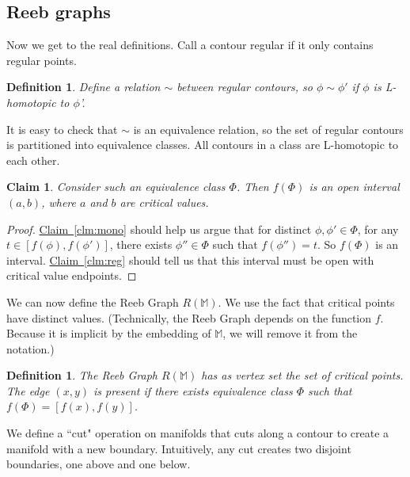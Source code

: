 \documentclass[11pt]{article}
\newtheorem{claim}[theorem]{Claim}
\newtheorem{definition}[theorem]{Definition}
\theoremstyle{definition}
\newcommand{\MM}{\mathbb{M}}
\newcommand{\Clm}[1]{\hyperref[clm:#1]{Claim~\ref*{clm:#1}}} %
\newcommand{\reeb}{R}
\begin{document}
\subsection{Reeb graphs} \label{sec:reeb}

Now we get to the real definitions. Call a contour regular if it only contains regular points.

\begin{definition} \label{def:rel} Define a relation $\sim$ between regular contours, so $\phi \sim \phi'$ if $\phi$
is L-homotopic to $\phi$'.
\end{definition}

It is easy to check that $\sim$ is an equivalence relation, so the set of regular contours
is partitioned into equivalence classes. All contours in a class are L-homotopic to each other.

\begin{claim} \label{clm:equiv} Consider such an equivalence class $\Phi$. Then $f(\Phi)$
is an open interval $(a,b)$, where $a$ and $b$ are critical values.
\end{claim}

\begin{proof} \Clm{mono} should help us argue that for distinct $\phi, \phi' \in \Phi$,
for any $t \in [f(\phi),f(\phi')]$, there exists $\phi'' \in \Phi$ such that $f(\phi'') = t$.
So $f(\Phi)$ is an interval. \Clm{reg} should tell us that this interval must be open
with critical value endpoints.
\end{proof}

We can now define the Reeb Graph $\reeb(\MM)$. We use the fact that critical points 
have distinct values. (Technically, the Reeb Graph depends on the function $f$.
Because it is implicit by the embedding of $\MM$, we will remove it from the notation.)

\begin{definition} \label{def:reeb} The \emph{Reeb Graph} $\reeb(\MM)$ has as vertex set
the set of critical points. The edge $(x,y)$ is present if there exists equivalence class
$\Phi$ such that $f(\Phi) = [f(x),f(y)]$.
\end{definition}

We define a ``cut" operation on manifolds that cuts along a contour to create
a manifold with a new boundary. Intuitively, any cut creates two disjoint boundaries, one
above and one below.
\end{document}
